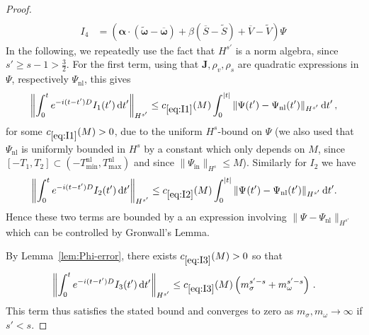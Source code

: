 \documentclass[10pt]{amsart}
\theoremstyle{definition}\newtheorem{defi}[theo]{Definition}\newtheorem{rema}[theo]{Remark}\newtheorem{exam}[theo]{Example}\newtheorem{exem}[theo]{Example}\newtheorem{nota}[theo]{Notation}
\newcommand{\rmin}{\mathrm{in}}
\newcommand{\nl}{\mathrm{nl}}
\renewcommand\d[1]{{\ensuremath{\,\text{d}#1}}}
\begin{document}
\begin{proof}
\begin{align}
\\
I_4&=\left(\bm\alpha\cdot (\widetilde{\bm \omega}-\overline{{\bm \omega}})+\beta(\overline{S}-\widetilde{S})+\overline{V}-\widetilde{V}\right)\Psi\,
\end{align}
In the following, we repeatedly use the fact that $H^{s'}$ is a norm algebra, since $s'\geq s-1>\tfrac32$. For the first term, using that ${\bm J}, \rho_v, \rho_s$ are quadratic expressions in $\Psi$, respectively $\Psi_\nl$, this gives
\begin{equation}\label{eq:I1}
\left\|\int_0^te^{-i(t-t')D}I_1(t')\d t'\right\|_{H^{s'}}\leq c_{\eqref{eq:I1}}(M)\int_0^{|t|}\|\Psi(t')-\Psi_{\nl}(t')\|_{H^{s'}}\d t'\,,
\end{equation}
for some $c_{\eqref{eq:I1}}(M)>0$, due to the uniform $H^{s}$-bound on $\Psi$ (we also used that $\Psi_{\nl}$ is uniformly bounded in $H^s$ by a constant which only depends on $M$, since $[-T_1,T_2]\subset(-T_{\min}^{\nl},T_{\max}^{\nl})$ and since $\|\Psi_{\rmin}\|_{H^s}\leq M$). Similarly for $I_2$ we have
\begin{equation}\label{eq:I2}
\left\|\int_0^te^{-i(t-t')D}I_2(t')\d t'\right\|_{H^{s'}} \leq c_{\eqref{eq:I2}}(M) \int_0^{|t|} \|\Psi_{}(t')-\Psi_{\nl}(t')\|_{H^{s'}} \d t'.
\end{equation}
Hence these two terms are bounded by a an expression involving $\|\Psi_{}-\Psi_{\nl}\|_{H^{s'}}$ which can be controlled by Gronwall's Lemma.

By Lemma~\ref{lem:Phi-error}, there exists $c_{\eqref{eq:I3}}(M)>0$ so that
\begin{equation}\label{eq:I3}
\left\|\int_0^te^{-i(t-t')D}I_3(t')\d t'\right\|_{H^{s'}}\leq c_{\eqref{eq:I3}}(M)\left(m_\sigma^{s'-s}+m_{\omega}^{s'-s}\right)\,.
\end{equation}
This term thus satisfies the stated bound and converges to zero as $m_\sigma, m_\omega\to \infty$ if $s'<s$.


\end{proof}
\end{document}
